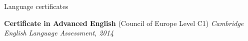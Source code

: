 \documentclass{resume} %
\begin{document}


\begin{rSection}{Language certificates}


{\bf Certificate in Advanced English} (Council of Europe Level C1) \hfill {\em Cambridge English Language Assessment, 2014}


\end{rSection}
\end{document}
